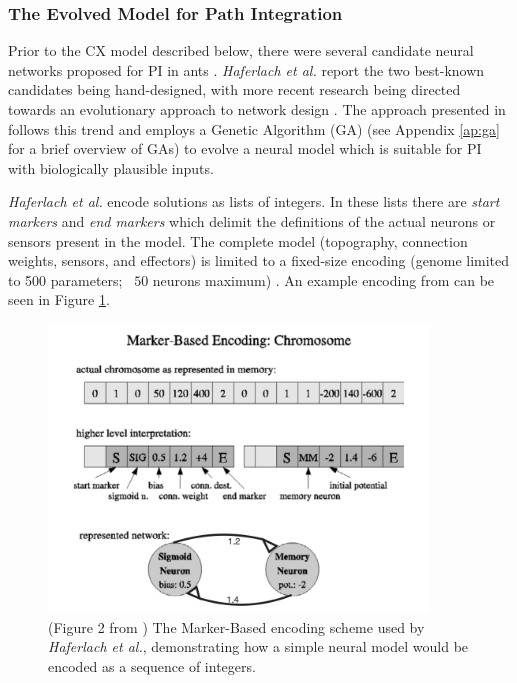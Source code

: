 \documentclass[a4paper,11pt,twoside,openright]{article}
\begin{document}
\subsubsection{The Evolved Model for Path Integration}
Prior to the CX model described below, there were several candidate
neural networks proposed for PI in ants
\cite{Haferlach2007}. \textit{Haferlach et al.}  report the two
best-known candidates being hand-designed, with more recent research
being directed towards an evolutionary approach to network design
\cite{Haferlach2007}. The approach presented in \cite{Haferlach2007}
follows this trend and employs a Genetic Algorithm (GA) (see Appendix
\ref{ap:ga} for a brief overview of GAs) to evolve a neural model
which is suitable for PI with biologically plausible inputs.
\newline
\par

\textit{Haferlach et al.} encode solutions as lists of integers. In these lists
there are \textit{start markers} and \textit{end markers} which delimit
the definitions of the actual neurons or sensors present in the model. The
complete model (topography, connection weights, sensors, and effectors) is
limited to a fixed-size encoding (genome limited to 500 parameters; ~$50$ neurons
maximum) \cite{Haferlach2007}. An example encoding from \cite{Haferlach2007} can
be seen in Figure \ref{fig:markerbasedencoding}.
\newline
\par


\begin{figure}[h!]
  \centering
  \includegraphics[width=0.9\textwidth]{MarkerBasedEncoding}
  \caption{\label{fig:markerbasedencoding} (Figure 2 from \cite{Haferlach2007})
    The Marker-Based encoding scheme used by \textit{Haferlach et al.},
    demonstrating how a simple neural model would be encoded as a sequence of
    integers.}
\end{figure}
\end{document}
